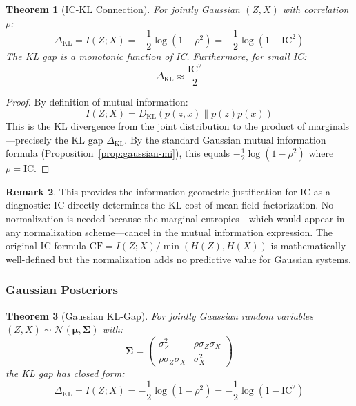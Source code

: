 \documentclass[10pt]{article} %
\theoremstyle{plain}
\newtheorem{theorem}{Theorem}[section]
\theoremstyle{definition}
\newtheorem{remark}[theorem]{Remark}
\newcommand{\IC}{\mathrm{IC}}  %
\begin{document}
\begin{theorem}[IC-KL Connection]
\label{thm:kl-gap}
For jointly Gaussian $(Z, X)$ with correlation $\rho$:
\begin{equation}
\Delta_{\text{KL}} = I(Z;X) = -\frac{1}{2}\log(1 - \rho^2) = -\frac{1}{2}\log(1 - \IC^2)
\end{equation}
The KL gap is a monotonic function of IC. Furthermore, for small IC:
\begin{equation}
\Delta_{\text{KL}} \approx \frac{\IC^2}{2}
\end{equation}
\end{theorem}

\begin{proof}
By definition of mutual information:
\begin{equation}
I(Z; X) = D_{\text{KL}}(p(z,x) \| p(z)p(x))
\end{equation}
This is the KL divergence from the joint distribution to the product of marginals---precisely the KL gap $\Delta_{\text{KL}}$. By the standard Gaussian mutual information formula (Proposition~\ref{prop:gaussian-mi}), this equals $-\frac{1}{2}\log(1-\rho^2)$ where $\rho = \IC$.
\end{proof}

\begin{remark}
This provides the information-geometric justification for IC as a diagnostic: IC directly determines the KL cost of mean-field factorization. No normalization is needed because the marginal entropies---which would appear in any normalization scheme---cancel in the mutual information expression. The original IC formula $\text{CF} = I(Z;X)/\min(H(Z),H(X))$ is mathematically well-defined but the normalization adds no predictive value for Gaussian systems.
\end{remark}

\subsubsection{Gaussian Posteriors}

\begin{theorem}[Gaussian KL-Gap]
\label{thm:gaussian-kl}
For jointly Gaussian random variables $(Z, X) \sim \mathcal{N}(\boldsymbol{\mu}, \boldsymbol{\Sigma})$ with:
\begin{equation}
\boldsymbol{\Sigma} = \begin{pmatrix} \sigma_Z^2 & \rho \sigma_Z \sigma_X \\ \rho \sigma_Z \sigma_X & \sigma_X^2 \end{pmatrix}
\end{equation}
the KL gap has closed form:
\begin{equation}
\Delta_{\text{KL}} = I(Z; X) = -\frac{1}{2}\log(1 - \rho^2) = -\frac{1}{2}\log(1 - \IC^2)
\end{equation}
\end{theorem}
\end{document}
